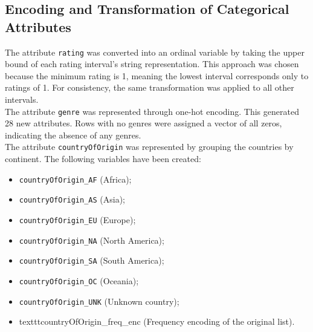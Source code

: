 \subsection{Encoding and Transformation of Categorical Attributes}
The attribute \texttt{rating} was converted into an ordinal variable by taking the upper bound of each rating
interval's string representation. This approach was chosen because the minimum rating is 1, meaning the
lowest interval corresponds only to ratings of 1. For consistency, the same transformation was applied
to all other intervals.\\

The attribute \texttt{genre} was represented through one-hot encoding. This generated 28 new attributes.
Rows with no genres were assigned a vector of all zeros, indicating the absence of any genres.\\

The attribute \texttt{countryOfOrigin} was represented by grouping the countries by continent.
The following variables have been created: 
\begin{multicols}{2}
    \begin{itemize}
        \item \texttt{countryOfOrigin\_AF} (Africa);
        \item \texttt{countryOfOrigin\_AS} (Asia);
        \item \texttt{countryOfOrigin\_EU} (Europe);
        \item \texttt{countryOfOrigin\_NA} (North America);
        \item \texttt{countryOfOrigin\_SA} (South America);
        \item \texttt{countryOfOrigin\_OC} (Oceania);
        \item \texttt{countryOfOrigin\_UNK} (Unknown country);
        \item texttt{countryOfOrigin\_freq\_enc} (Frequency encoding of the original list).
    \end{itemize}
\end{multicols}

